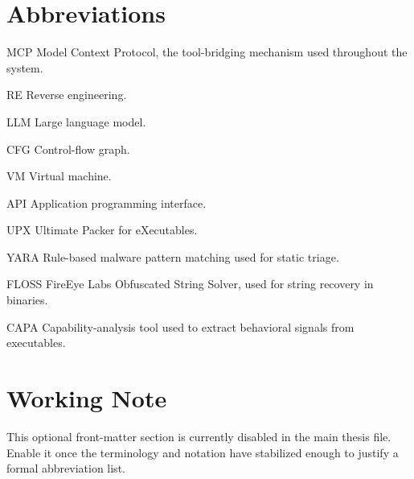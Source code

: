 \abbreviations

\section*{Abbreviations}

\begin{symbollist}
\item[MCP] Model Context Protocol, the tool-bridging mechanism used throughout the system.
\item[RE] Reverse engineering.
\item[LLM] Large language model.
\item[CFG] Control-flow graph.
\item[VM] Virtual machine.
\item[API] Application programming interface.
\item[UPX] Ultimate Packer for eXecutables.
\item[YARA] Rule-based malware pattern matching used for static triage.
\item[FLOSS] FireEye Labs Obfuscated String Solver, used for string recovery in binaries.
\item[CAPA] Capability-analysis tool used to extract behavioral signals from executables.
\end{symbollist}

\section*{Working Note}

This optional front-matter section is currently disabled in the main thesis file. Enable it once the terminology and notation have stabilized enough to justify a formal abbreviation list.
